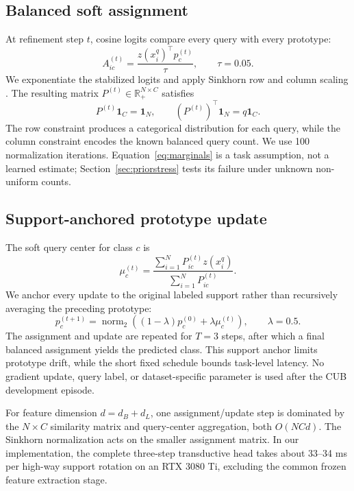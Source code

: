 \documentclass[10pt,twocolumn]{article}
\begin{document}
\subsection{Balanced soft assignment}

At refinement step $t$, cosine logits compare every query with every prototype:
\begin{equation}
 A_{ic}^{(t)}=\frac{z(x_i^q)^\top p_c^{(t)}}{\tau},
 \qquad \tau=0.05.
 \label{eq:logits}
\end{equation}
We exponentiate the stabilized logits and apply Sinkhorn row and column scaling
\cite{sinkhorn}. The resulting matrix $P^{(t)}\in\mathbb{R}_+^{N\times C}$
satisfies
\begin{equation}
 P^{(t)}\mathbf{1}_{C}=\mathbf{1}_{N},\qquad
 (P^{(t)})^\top\mathbf{1}_{N}=q\mathbf{1}_{C}.
 \label{eq:marginals}
\end{equation}
The row constraint produces a categorical distribution for each query, while
the column constraint encodes the known balanced query count. We use 100
normalization iterations. Equation~\eqref{eq:marginals} is a task assumption,
not a learned estimate; Section~\ref{sec:priorstress} tests its failure under
unknown non-uniform counts.

\subsection{Support-anchored prototype update}

The soft query center for class $c$ is
\begin{equation}
 \mu_c^{(t)}=\frac{\sum_{i=1}^{N}P_{ic}^{(t)}z(x_i^q)}
 {\sum_{i=1}^{N}P_{ic}^{(t)}}.
 \label{eq:center}
\end{equation}
We anchor every update to the original labeled support rather than recursively
averaging the preceding prototype:
\begin{equation}
 p_c^{(t+1)}=\operatorname{norm}_2\left(
 (1-\lambda)p_c^{(0)}+\lambda\mu_c^{(t)}\right),
 \qquad \lambda=0.5.
 \label{eq:update}
\end{equation}
The assignment and update are repeated for $T=3$ steps, after which a final
balanced assignment yields the predicted class. This support anchor limits
prototype drift, while the short fixed schedule bounds task-level latency.
No gradient update, query label, or dataset-specific parameter is used after the
CUB development episode.

For feature dimension $d=d_B+d_L$, one assignment/update step is dominated by
the $N\times C$ similarity matrix and query-center aggregation, both
$O(NCd)$. The Sinkhorn normalization acts on the smaller assignment matrix. In
our implementation, the complete three-step transductive head takes about
33--34 ms per high-way support rotation on an RTX 3080 Ti, excluding the common
frozen feature extraction stage.
\end{document}
